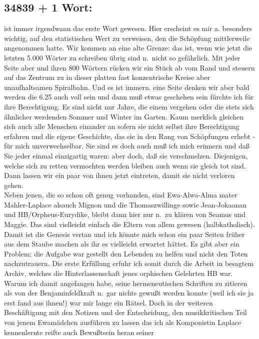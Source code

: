 \documentclass[
]{article}
\author{}
\date{\vspace{-2.5em}}
\begin{document}
\subsection{34839 + 1 Wort:}\label{wort}

ist immer irgendwann das erste Wort gewesen. Hier erscheint es mir a.
besonders wichtig, auf den statistischen Wert zu verweisen, den die
Schöpfung mittlerweile angenommen hatte. Wir kommen an eine alte Grenze:
das ist, wenn wie jetzt die letzten 5.000 Wörter zu schreiben übrig sind
n.~nicht so gefährlich. Mit jeder Seite aber und ihren 800 Wörtern
rücken wir ein Stück ab vom Rand und steuern auf das Zentrum zu in
dieser platten fast konzentrische Kreise aber unaufhaltsamen Spiralbahn.
Und es ist immern. eine Seite denken wir aber bald werden die 6.25 auch
voll sein und dann muß etwas geschehen sein fürchte ich für ihre
Berechtigung. Es sind nicht nur Jahre, die einem vergehen oder die stets
sich ähnlicher werdenden Sommer und Winter im Garten. Kaum merklich
gleichen sich auch alle Menschen einander an sofern sie nicht selbst
ihre Berechtigung erfahren und die eigene Geschichte, das sie in den
Rang von Schöpfungen erhebt - für mich unverwechselbar. Sie sind es doch
auch muß ich mich erinnern und daß Sie jeder einmal einzigartig waren:
aber doch, daß sie verschmelzen. Diejenigen, welche sich zu retten
vermochten werden bleiben auch wenn sie gleich tot sind. Dann lassen wir
ein paar von ihnen jetzt eintreten, damit sie nicht verloren gehen.\\
Neben jenen, die so schon oft genug vorhanden, sind Ewa-Alwa-Alma mater
Mahler-Laplace alsauch Mignon und die Thomaszwillinge sowie
Jean-Jokaanan und HB/Orpheus-Eurydike, bleibt dann hier nur n.~zu klären
von Seamus und Maggie. Das sind vielleicht einfach die Eltern von allem
gewesen (halbkatholisch). Damit ist die Genesis vertan und ich könnte
mich schon ein paar Seiten früher aus dem Staube machen als ihr es
vielleicht erwartet hättet. Es gibt aber ein Problem: die Aufgabe war
gestellt den Lebenden zu helfen und nicht den Toten nachzutrauern. Die
erste Erfüllung erfuhr ich somit durch die Arbeit in besagtem Archiv,
welches die Hinterlassenschaft jenes orphischen Gelehrten HB war. Warum
ich damit angefangen habe, seine hermeneutischen Schriften zu zitieren
als von der Benjaminfeldkraft n.~gar nichts gewußt werden konnte (weil
ich sie ja erst fand aus ihnen!) war mir lange ein Rätsel. Doch in der
weiteren Beschäftigung mit den Notizen und der Entscheidung, den
musikkritischen Teil von jenem Ewamädchen ausführen zu lassen das ich
als Komponistin Laplace kennenlernte reifte auch Bewußtsein heran seiner
\end{document}
